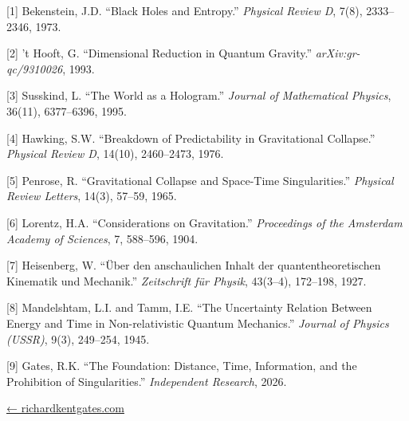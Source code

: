 \documentclass[
  10pt,
]{article}
\begin{document}
{[}1{]} Bekenstein, J.D. ``Black Holes and Entropy.'' \emph{Physical
Review D}, 7(8), 2333--2346, 1973.

{[}2{]} 't Hooft, G. ``Dimensional Reduction in Quantum Gravity.''
\emph{arXiv:gr-qc/9310026}, 1993.

{[}3{]} Susskind, L. ``The World as a Hologram.'' \emph{Journal of
Mathematical Physics}, 36(11), 6377--6396, 1995.

{[}4{]} Hawking, S.W. ``Breakdown of Predictability in Gravitational
Collapse.'' \emph{Physical Review D}, 14(10), 2460--2473, 1976.

{[}5{]} Penrose, R. ``Gravitational Collapse and Space-Time
Singularities.'' \emph{Physical Review Letters}, 14(3), 57--59, 1965.

{[}6{]} Lorentz, H.A. ``Considerations on Gravitation.''
\emph{Proceedings of the Amsterdam Academy of Sciences}, 7, 588--596,
1904.

{[}7{]} Heisenberg, W. ``Über den anschaulichen Inhalt der
quantentheoretischen Kinematik und Mechanik.'' \emph{Zeitschrift für
Physik}, 43(3--4), 172--198, 1927.

{[}8{]} Mandelshtam, L.I. and Tamm, I.E. ``The Uncertainty Relation
Between Energy and Time in Non-relativistic Quantum Mechanics.''
\emph{Journal of Physics (USSR)}, 9(3), 249--254, 1945.

{[}9{]} Gates, R.K. ``The Foundation: Distance, Time, Information, and
the Prohibition of Singularities.'' \emph{Independent Research}, 2026.

\href{https://richardkentgates.com/}{← richardkentgates.com}
\end{document}
